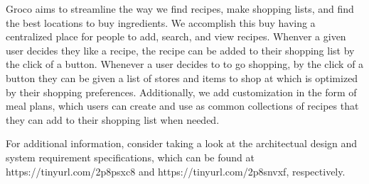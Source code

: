 Groco aims to streamline the way we find recipes, make shopping lists, and find the best locations to buy ingredients.  We accomplish this buy having a centralized place for people to add, search, and view recipes.  Whenver a given user decides they like a recipe, the recipe can be added to their shopping list by the click of a button.  Whenever a user decides to to go shopping, by the click of a button they can be given a list of stores and items to shop at which is optimized by their shopping preferences.  Additionally, we add customization in the form of meal plans, which users can create and use as common collections of recipes that they can add to their shopping list when needed.

For additional information, consider taking a look at the architectual design and system requirement specifications, which can be found at https://tinyurl.com/2p8psxc8 and https://tinyurl.com/2p8snvxf, respectively.
